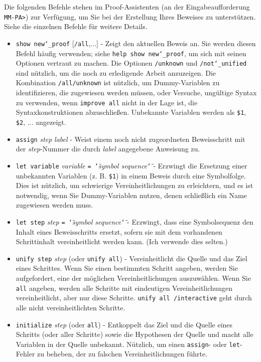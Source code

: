Die folgenden Befehle stehen im Proof-Assistenten (an der Eingabeaufforderung \texttt{MM-PA>}) zur Verfügung, um Sie bei der Erstellung Ihres Beweises zu unterstützen.  Siehe die einzelnen Befehle für weitere Details. 

\begin{itemize}
\item[]
    \texttt{show new{\char`\_}proof} [\texttt{/all},...] - Zeigt den aktuellen Beweis an.  Sie werden diesen Befehl häufig verwenden; siehe \texttt{help show new{\char`\_}proof}, um sich mit seinen Optionen vertraut zu machen.  Die Optionen \texttt{/unknown} und \texttt{/not{\char`\_}unified} sind nützlich, um die noch zu erledigende Arbeit anzuzeigen.  Die Kombination \texttt{/all/unknown} ist nützlich, um Dummy-Variablen zu identifizieren, die zugewiesen werden müssen, oder Versuche, ungültige Syntax zu verwenden, wenn \texttt{improve all} nicht in der Lage ist, die Syntaxkonstruktionen abzuschließen.  Unbekannte Variablen werden als \texttt{\$1}, \texttt{\$2}, ... angezeigt.
\item[]
    \texttt{assign} {\em step} {\em label} - Weist einem noch nicht zugeordneten Beweisschritt mit der {\em step}-Nummer die durch {\em label} angegebene Anweisung zu.
\item[]
    \texttt{let variable} {\em variable}
        \texttt{= \char`\"}{\em symbol sequence}\texttt{\char`\"}
          - Erzwingt die Ersetzung einer unbekannten Variablen (z. B. \texttt{\$1}) in einem Beweis durch eine Symbolfolge. Dies ist nützlich, um schwierige Vereinheitlichungen zu erleichtern, und es ist notwendig, wenn Sie Dummy-Variablen nutzen, denen schließlich ein Name zugewiesen werden muss.
\item[]
    \texttt{let step} {\em step} \texttt{= \char`\"}{\em symbol sequence}\texttt{\char`\"} - Erzwingt, dass eine Symbolsequenz den Inhalt eines Beweisschritts ersetzt, sofern sie mit dem vorhandenen Schrittinhalt vereinheitlicht werden kann.  (Ich verwende dies selten.)
\item[]
    \texttt{unify step} {\em step} (oder \texttt{unify all}) - Vereinheitlicht die Quelle und das Ziel eines Schrittes.  Wenn Sie einen bestimmten Schritt angeben, werden Sie aufgefordert, eine der möglichen Vereinheitlichungen auszuwählen.  Wenn Sie \texttt{all} angeben, werden alle Schritte mit eindeutigen Vereinheitlichungen vereinheitlicht, aber nur diese Schritte.  \texttt{unify all /interactive} geht durch alle nicht vereinheitlichten Schritte.
\item[]
    \texttt{initialize} {\em step} (oder \texttt{all}) - Entkoppelt das Ziel und die Quelle eines Schritts (oder aller Schritte) sowie die Hypothesen der Quelle und macht alle Variablen in der Quelle unbekannt.  Nützlich, um einen \texttt{assign}- oder \texttt{let}-Fehler zu beheben, der zu falschen Vereinheitlichungen führte.

\end{itemize}

